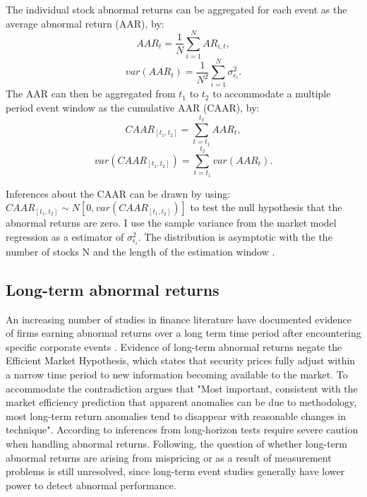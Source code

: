  The individual stock abnormal returns can be aggregated for each event as the average abnormal return (AAR), by:  
 \begin{equation}
 AAR_t = \frac{1}{N} \sum_{i=1} ^N AR_{i,t},
 \end{equation}
 \begin{equation}
 var(AAR_{t}) = \frac{1}{N^2} \sum_{i=1} ^N \sigma_{\epsilon_i} ^2.
 \end{equation}
 The AAR can then be aggregated from $t_1$ to $t_2$ to accommodate a multiple period event window as the cumulative AAR (CAAR), by:
 \begin{equation}
 CAAR_{[t_1,t_2]} = \sum_{t = t_1 } ^{t_2} AAR_{t},
 \end{equation}
 \begin{equation}
 var(CAAR_{[t_1,t_2]}) = \sum ^{t_2}_{t=t_1} var(AAR_t).
 \end{equation}
 
Inferences about the CAAR can be drawn by using: $CAAR_{[t_1,t_2]} \sim N[0,var(CAAR_{[t_1,t_2]})]$ to test the null hypothesis that the abnormal returns are zero. I use the sample variance from the market model regression as a estimator of $\sigma^2_{\epsilon_i}$. The distribution is asymptotic with the the number of stocks N and the length of the estimation window \cite{Event_studies}.  
 
 

\subsection{Long-term abnormal returns}

An increasing number of studies in finance literature have documented evidence of firms earning abnormal returns over a long term time period after encountering specific corporate events \citep{kothari}. Evidence of long-term abnormal returns negate the Efficient Market Hypothesis, which states that security prices fully adjust within a narrow time period to new information becoming available to the market. To accommodate the contradiction \cite{fama1998_events} argues that "Most important, consistent with the market efficiency prediction that apparent anomalies can be due to methodology, most long-term return anomalies tend to disappear with reasonable changes in technique". According to \cite{kothari} inferences from long-horizon tests require severe caution when handling abnormal returns. Following, the question of whether long-term abnormal returns are arising from mispricing or as a result of measurement problems is still unresolved, since long-term event studies generally have lower power to detect abnormal performance. 


